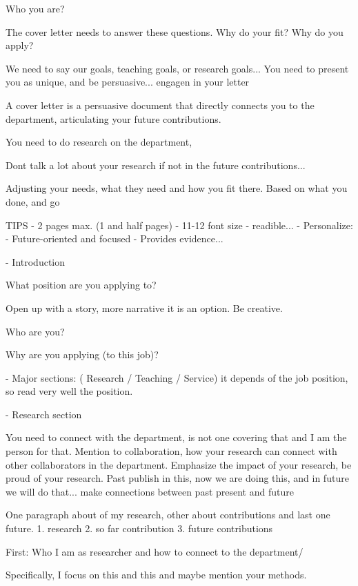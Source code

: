 Who you are?

The cover letter needs to answer these questions.
Why do your fit? Why do you apply?

We need to say our goals, teaching goals, or research goals... You need to present you as unique, and be persuasive... engagen in your letter

A cover letter is a persuasive document that directly connects you to the department, articulating your future contributions.

You need to do research on the department, 

Dont talk a lot about your research if not in the future contributions...

Adjusting your needs, what they need and how you fit there. Based on what you done, and go 


TIPS
- 2 pages max. (1 and half pages)
- 11-12 font size - readible... 
- Personalize: 
- Future-oriented and focused
- Provides evidence...


- Introduction

What position are you applying to?

Open up with a story, more narrative it is an option. Be creative. 

Who are you?


Why are you applying (to this job)?

- Major sections: ( Research / Teaching / Service) it depends of the job position, so read very well the position. 


- Research section

You need to connect with the department, is not one covering that and I am the person for that. 
Mention to collaboration, how your research can connect with other collaborators in the department.
Emphasize the impact of your research, be proud of your research.
Past publish in this, now we are doing this, and in future we will do that... make connections between past present and future

One paragraph about of my research, other about contributions and last one future.
1. research 
2. so far contribution
3. future contributions


First:
Who I am as researcher and how to connect to the department/

Specifically, I focus on this and this and maybe mention your methods.

